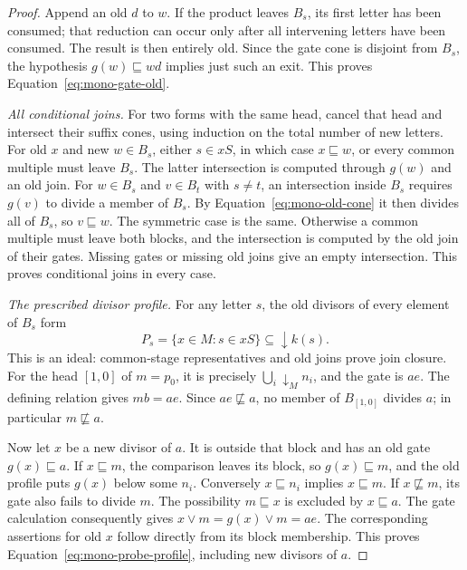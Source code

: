 \begin{proof}
Append an old $d$ to $w$.  If the product leaves $B_s$, its first
letter has been consumed; that reduction can occur only after all
intervening letters have been consumed.  The result is then entirely
old.  Since the gate cone is disjoint from $B_s$, the hypothesis
$g(w)\sqsubseteq wd$ implies just such an exit.  This proves
Equation~\eqref{eq:mono-gate-old}.

\smallskip\noindent\textit{All conditional joins.}
For two forms with the same head, cancel that head and intersect their
suffix cones, using induction on the total number of new letters.
For old $x$ and new $w\in B_s$, either $s\in xS$, in which case
$x\sqsubseteq w$, or every common multiple must leave $B_s$.
The latter intersection is computed through $g(w)$ and an old join.
For $w\in B_s$ and $v\in B_t$ with $s\ne t$, an intersection
inside $B_s$ requires $g(v)$ to divide a member of $B_s$.  By
Equation~\eqref{eq:mono-old-cone} it then divides all of $B_s$, so
$v\sqsubseteq w$.  The symmetric case is the same.  Otherwise a
common multiple must leave both blocks, and the intersection is
computed by the old join of their gates.  Missing gates or missing
old joins give an empty intersection.  This proves conditional joins
in every case.

\smallskip\noindent\textit{The prescribed divisor profile.}
For any letter $s$, the old divisors of every element of $B_s$ form
\begin{equation}\label{eq:mono-letter-ideal}
 P_s=\{x\in M:s\in xS\}\subseteq\downarrow k(s).
\end{equation}
This is an ideal: common-stage representatives and old joins prove
join closure.  For the head $[1,0]$ of $m=p_0$, it is precisely
$\bigcup_i\downarrow_M n_i$, and the gate is $ae$.  The defining
relation gives $mb=ae$.  Since $ae\not\sqsubseteq a$, no member
of $B_{[1,0]}$ divides $a$; in particular $m\not\sqsubseteq a$.

Now let $x$ be a new divisor of $a$.  It is outside that block and
has an old gate $g(x)\sqsubseteq a$.  If $x\sqsubseteq m$, the
comparison leaves its block, so $g(x)\sqsubseteq m$, and the old
profile puts $g(x)$ below some $n_i$.  Conversely $x\sqsubseteq n_i$
implies $x\sqsubseteq m$.  If $x\not\sqsubseteq m$, its gate also
fails to divide $m$.  The possibility $m\sqsubseteq x$ is excluded
by $x\sqsubseteq a$.  The gate calculation consequently gives
$x\vee m=g(x)\vee m=ae$.  The corresponding assertions for old
$x$ follow directly from its block membership.  This proves
Equation~\eqref{eq:mono-probe-profile}, including new divisors of $a$.
\end{proof}


